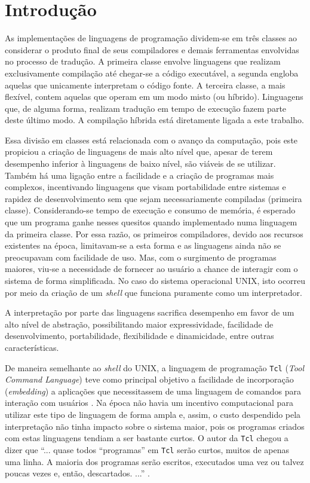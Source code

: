 \chapter{Introdução}

As implementações de linguagens de programação dividem-se em três
classes ao
considerar o produto final de seus compiladores e demais
ferramentas envolvidas no processo de tradução. A primeira classe
envolve linguagens que realizam exclusivamente compilação até
chegar-se a código executável, a segunda engloba aquelas que
unicamente interpretam o código fonte. A terceira classe, a mais
flexível, contem aquelas que operam em um modo misto (ou híbrido).
Linguagens que, de alguma forma,
realizam tradução em tempo de execução fazem parte deste último modo.
A compilação híbrida está diretamente ligada a este
trabalho.

Essa divisão em classes está relacionada com o avanço da computação,
pois este propiciou
a criação de linguagens de mais alto nível que, apesar de
terem desempenho inferior à linguagens de baixo nível,
são viáveis de se utilizar. Também há uma ligação entre a facilidade e a
criação de programas mais complexos, incentivando linguagens que visam
portabilidade entre sistemas e rapidez de desenvolvimento sem
que sejam necessariamente compiladas (primeira classe).
Considerando-se tempo de execução e
consumo de memória, é esperado que um programa ganhe
nesses quesitos quando implementado numa linguagem da primeira
classe. Por essa razão, os primeiros compiladores,
devido aos recursos existentes na época, limitavam-se a esta
forma e as linguagens ainda não se preocupavam com facilidade de uso.
Mas, com o surgimento de programas maiores, viu-se a necessidade de
fornecer ao usuário a chance de interagir com o sistema de forma
simplificada. %
No caso do
sistema operacional UNIX, isto ocorreu por meio da criação de
um \textit{shell} que funciona puramente como um interpretador.

A interpretação por parte das linguagens sacrifica desempenho em
favor de um alto nível de abstração, possibilitando maior
expressividade, facilidade de
desenvolvimento, portabilidade, flexibilidade e dinamicidade, entre
outras características.

De maneira semelhante ao \textit{shell} do UNIX,
a linguagem de programação \texttt{Tcl} (\textit{Tool Command Language})
teve como principal objetivo a
facilidade de incorporação (\textit{embedding}) a aplicações que
necessitassem de uma linguagem de comandos para
interação com usuários \cite{ousterhout_89}.
Na época não havia um
incentivo computacional para utilizar este tipo de linguagem de forma
ampla e, assim, o custo despendido pela interpretação não tinha
impacto sobre o sistema maior, pois os programas criados com estas linguagens
tendiam a ser bastante curtos. O autor da \texttt{Tcl} chegou a dizer
que ``... quase todos ``programas'' em \texttt{Tcl} serão curtos,
muitos de apenas uma linha. A maioria dos programas serão escritos,
executados uma vez ou talvez poucas vezes e, então,
descartados. ...'' \cite{ousterhout_89}.

